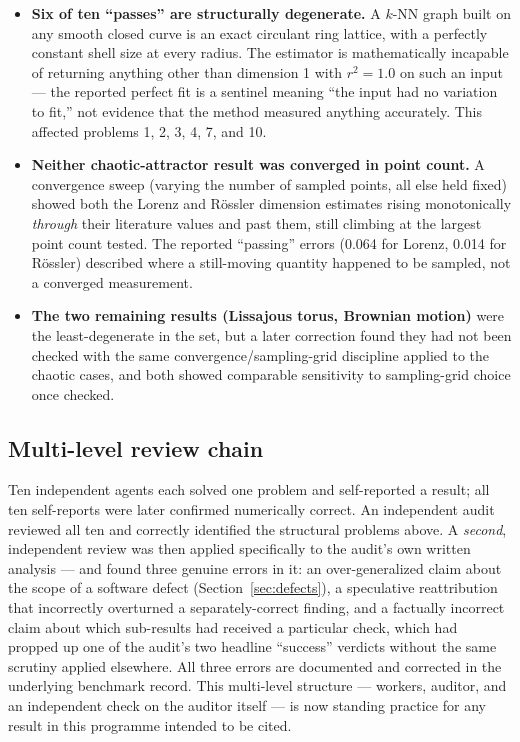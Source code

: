 \documentclass[11pt,a4paper]{article}
\begin{document}
\begin{itemize}
\item \textbf{Six of ten ``passes'' are structurally degenerate.} A $k$-NN
  graph built on any smooth closed curve is an exact circulant ring
  lattice, with a perfectly constant shell size at every radius. The
  estimator is mathematically incapable of returning anything other than
  dimension 1 with $r^2=1.0$ on such an input --- the reported perfect fit
  is a sentinel meaning ``the input had no variation to fit,'' not
  evidence that the method measured anything accurately. This affected
  problems 1, 2, 3, 4, 7, and 10.
\item \textbf{Neither chaotic-attractor result was converged in point
  count.} A convergence sweep (varying the number of sampled points, all
  else held fixed) showed both the Lorenz and R\"ossler dimension
  estimates rising monotonically \emph{through} their literature values
  and past them, still climbing at the largest point count tested. The
  reported ``passing'' errors (0.064 for Lorenz, 0.014 for R\"ossler)
  described where a still-moving quantity happened to be sampled, not a
  converged measurement.
\item \textbf{The two remaining results (Lissajous torus, Brownian
  motion)} were the least-degenerate in the set, but a later correction
  found they had not been checked with the same convergence/sampling-grid
  discipline applied to the chaotic cases, and both showed comparable
  sensitivity to sampling-grid choice once checked.
\end{itemize}

\subsection{Multi-level review chain}
\label{sec:audit-chain}

Ten independent agents each solved one problem and self-reported a result;
all ten self-reports were later confirmed numerically correct. An
independent audit reviewed all ten and correctly identified the structural
problems above. A \emph{second}, independent review was then applied
specifically to the audit's own written analysis --- and found three
genuine errors in it: an over-generalized claim about the scope of a
software defect (Section~\ref{sec:defects}), a speculative reattribution
that incorrectly overturned a separately-correct finding, and a factually
incorrect claim about which sub-results had received a particular check,
which had propped up one of the audit's two headline ``success'' verdicts
without the same scrutiny applied elsewhere. All three errors are
documented and corrected in the underlying benchmark record. This
multi-level structure --- workers, auditor, and an independent check on
the auditor itself --- is now standing practice for any result in this
programme intended to be cited.
\end{document}
